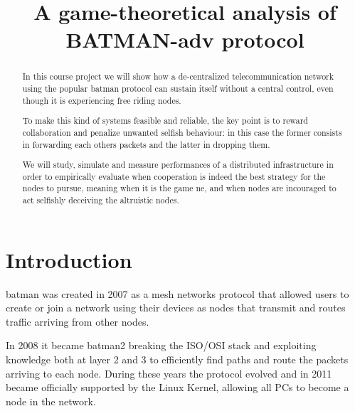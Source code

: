 \documentclass[conference,10.5pt]{IEEEtran}
\begin{document}
\title{A game-theoretical analysis of BATMAN-adv protocol}

\author{
\and
{}
}

\maketitle

\begin{abstract}
  In this course project we will show how a de-centralized telecommunication network using the popular \gls{batman} protocol can sustain itself without a central control, even though it is experiencing free riding nodes.

  To make this kind of systems feasible and reliable, the key point is to reward collaboration and penalize unwanted selfish behaviour: in this case the former consists in forwarding each others packets and the latter in dropping them.

  We will study, simulate and measure performances of a distributed infrastructure in order to empirically evaluate when cooperation is indeed the best strategy for the nodes to pursue, meaning when it is the game \gls{ne}, and when nodes are incouraged to act selfishly deceiving the altruistic nodes.
\end{abstract}

\section{Introduction}


\gls{batman} was created in 2007 as a mesh networks protocol that allowed users to create or join a network using their devices as nodes that transmit and routes traffic arriving from other nodes.

In 2008 it became \gls{batman2} breaking the ISO/OSI stack and exploiting knowledge both at layer 2 and 3 to efficiently find paths and route the packets arriving to each node. During these years the protocol evolved and in 2011 became officially supported by the Linux Kernel, allowing all PCs to become a node in the network.
\end{document}
